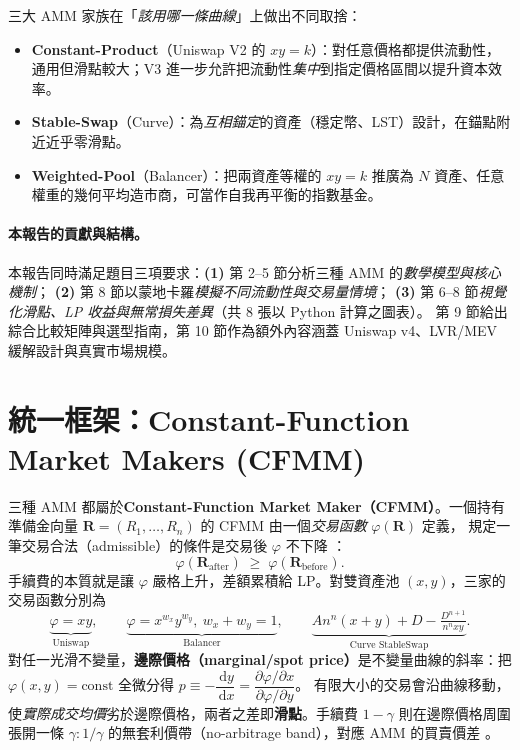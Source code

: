 \documentclass[11pt,a4paper]{article}
\newcommand{\df}{\,\mathrm{d}}
\begin{document}
三大 AMM 家族在「\emph{該用哪一條曲線}」上做出不同取捨：
\begin{itemize}
  \item \textbf{Constant-Product}（Uniswap V2 的 $xy=k$）：對任意價格都提供流動性，通用但滑點較大；V3 進一步允許把流動性\emph{集中}到指定價格區間以提升資本效率。
  \item \textbf{Stable-Swap}（Curve）：為\emph{互相錨定}的資產（穩定幣、LST）設計，在錨點附近近乎零滑點。
  \item \textbf{Weighted-Pool}（Balancer）：把兩資產等權的 $xy=k$ 推廣為 $N$ 資產、任意權重的幾何平均造市商，可當作自我再平衡的指數基金。
\end{itemize}

\paragraph{本報告的貢獻與結構。}
本報告同時滿足題目三項要求：\textbf{(1)} 第 2--5 節分析三種 AMM 的\emph{數學模型與核心機制}；
\textbf{(2)} 第 8 節以蒙地卡羅\emph{模擬不同流動性與交易量情境}；
\textbf{(3)} 第 6--8 節\emph{視覺化滑點、LP 收益與無常損失差異}（共 8 張以 Python 計算之圖表）。
第 9 節給出綜合比較矩陣與選型指南，第 10 節作為額外內容涵蓋 Uniswap v4、LVR/MEV 緩解設計與真實市場規模。

\section{統一框架：Constant-Function Market Makers (CFMM)}\label{sec:cfmm}
三種 AMM 都屬於\textbf{Constant-Function Market Maker（CFMM）}。一個持有準備金向量 $\mathbf{R}=(R_1,\dots,R_n)$ 的 CFMM 由一個\emph{交易函數} $\varphi(\mathbf{R})$ 定義，
規定一筆交易合法（admissible）的條件是交易後 $\varphi$ 不下降 \citep{angeris2019uniswap,angeris2020oracles}：
\begin{equation}
\varphi(\mathbf{R}_{\text{after}}) \;\geq\; \varphi(\mathbf{R}_{\text{before}}).
\end{equation}
手續費的本質就是讓 $\varphi$ 嚴格上升，差額累積給 LP。對雙資產池 $(x,y)$，三家的交易函數分別為
\begin{equation}
\underbrace{\varphi=xy}_{\text{Uniswap}},\qquad
\underbrace{\varphi=x^{w_x}y^{w_y},\ w_x+w_y=1}_{\text{Balancer}},\qquad
\underbrace{An^n(x{+}y)+D-\tfrac{D^{n+1}}{n^n xy}}_{\text{Curve StableSwap}}.
\end{equation}
對任一光滑不變量，\textbf{邊際價格（marginal/spot price）}是不變量曲線的斜率：把 $\varphi(x,y)=\text{const}$ 全微分得
$p \equiv -\dfrac{\df y}{\df x} = \dfrac{\partial\varphi/\partial x}{\partial\varphi/\partial y}$。
有限大小的交易會沿曲線移動，使\emph{實際成交均價}劣於邊際價格，兩者之差即\textbf{滑點}。手續費 $1-\gamma$ 則在邊際價格周圍張開一條
$\gamma : 1/\gamma$ 的無套利價帶（no-arbitrage band），對應 AMM 的買賣價差 \citep{angeris2019uniswap}。
\end{document}
